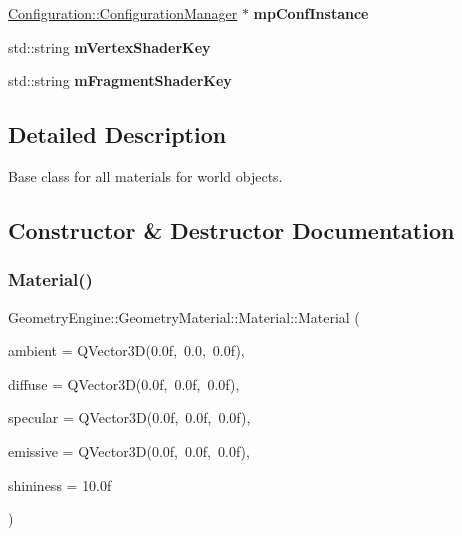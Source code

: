 \begin{DoxyCompactItemize}
\item 
\mbox{\label{class_geometry_engine_1_1_geometry_material_1_1_material_a734ca9fb3bd1d82c54d1475c7ea43c11}} 
\mbox{\hyperlink{class_configuration_1_1_configuration_manager}{Configuration\+::\+Configuration\+Manager}} $\ast$ {\bfseries mp\+Conf\+Instance}
\item 
\mbox{\label{class_geometry_engine_1_1_geometry_material_1_1_material_a648069f204424e495149dbfadf4ede40}} 
std\+::string {\bfseries m\+Vertex\+Shader\+Key}
\item 
\mbox{\label{class_geometry_engine_1_1_geometry_material_1_1_material_ab92ad73bbce983d9fcd7ac41c4dce59d}} 
std\+::string {\bfseries m\+Fragment\+Shader\+Key}
\end{DoxyCompactItemize}


\subsection{Detailed Description}
Base class for all materials for world objects. 

\subsection{Constructor \& Destructor Documentation}
\mbox{\label{class_geometry_engine_1_1_geometry_material_1_1_material_aeae49a84f5f5b5e0c6ded1ba61e43f76}} 
\subsubsection{\texorpdfstring{Material()}{Material()}\hspace{0.1cm}{\footnotesize\ttfamily [1/2]}}
{\footnotesize\ttfamily Geometry\+Engine\+::\+Geometry\+Material\+::\+Material\+::\+Material (\begin{DoxyParamCaption}\item[{const Q\+Vector3D \&}]{ambient = {\ttfamily QVector3D(0.0f,~0.0,~0.0f)},  }\item[{const Q\+Vector3D \&}]{diffuse = {\ttfamily QVector3D(0.0f,~0.0f,~0.0f)},  }\item[{const Q\+Vector3D \&}]{specular = {\ttfamily QVector3D(0.0f,~0.0f,~0.0f)},  }\item[{const Q\+Vector3D \&}]{emissive = {\ttfamily QVector3D(0.0f,~0.0f,~0.0f)},  }\item[{float}]{shininess = {\ttfamily 10.0f} }\end{DoxyParamCaption})}

